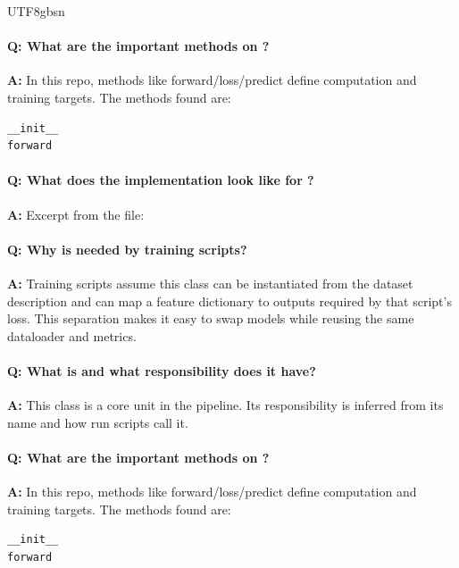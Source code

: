 \documentclass[11pt]{article}
\begin{document}
\begin{CJK*}{UTF8}{gbsn}
\paragraph{Q: What are the important methods on \texttt{}?}
\textbf{A:} In this repo, methods like forward/loss/predict define computation and training targets. The methods found are:

\begin{Verbatim}[fontsize=\small]
__init__
forward
\end{Verbatim}

\paragraph{Q: What does the implementation look like for \texttt{}?}
\textbf{A:} Excerpt from the file:

\vspace{1mm}


\paragraph{Q: Why is \texttt{} needed by training scripts?}
\textbf{A:} Training scripts assume this class can be instantiated from the dataset description and can map a feature dictionary to outputs required by that script's loss. This separation makes it easy to swap models while reusing the same dataloader and metrics.

\paragraph{Q: What is \texttt{} and what responsibility does it have?}
\textbf{A:} This class is a core unit in the pipeline. Its responsibility is inferred from its name and how run scripts call it.

\paragraph{Q: What are the important methods on \texttt{}?}
\textbf{A:} In this repo, methods like forward/loss/predict define computation and training targets. The methods found are:

\begin{Verbatim}[fontsize=\small]
__init__
forward
\end{Verbatim}


\end{CJK*}
\end{document}
